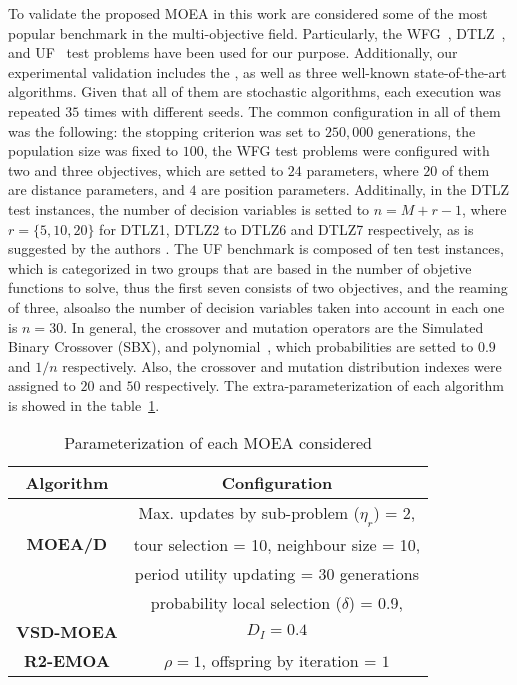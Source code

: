 %
To validate the proposed MOEA in this work are considered some of the most popular benchmark in the multi-objective field.
%
Particularly, the WFG~\cite{Joel:WFG}, DTLZ~\cite{Joel:DTLZ}, and UF~\cite{Joel:CEC2009} test problems have been used for our purpose. 
%
Additionally, our experimental validation includes the \VSDMOEA{}, as well as three well-known state-of-the-art algorithms.
%
Given that all of them are stochastic algorithms, each execution was repeated $35$ times with different seeds.
%
The common configuration in all of them was the following: the stopping criterion was set to $250,000$ generations, the population size was fixed to $100$, the WFG test problems were configured with two and three objectives, which are setted to $24$ parameters, where $20$ of them are distance parameters, and $4$ are position parameters.
%
Additinally, in the DTLZ test instances, the number of decision variables is setted to $n=M+r-1$, where $r=\{5, 10, 20\}$ for DTLZ1, DTLZ2 to DTLZ6 and DTLZ7 respectively, as is suggested by the authors \cite{Joel:DTLZ}.  
% 
The UF benchmark is composed of ten test instances, which is categorized in two groups that are based in the number of objetive functions to solve, thus the first seven consists of two objectives, and the reaming of three, alsoalso  the number of decision variables taken into account in each one is $n=30$.
%
In general, the crossover and mutation operators are the Simulated Binary Crossover (SBX), and polynomial~\cite{Joel:SBX1994, Joel:Mutation}, which probabilities are setted to $0.9$ and $1/n$ respectively.
%
Also, the crossover and mutation distribution indexes were assigned to $20$ and $50$ respectively.
%
The extra-parameterization of each algorithm is showed in the table~\ref{tab:Parametrization}.
%
\begin{table}[t]
\centering
\caption{Parameterization of each MOEA considered}
\label{tab:Parametrization}
\begin{tabular}{c|c}
\hline
\textbf{Algorithm} & \textbf{Configuration} \\ \hline
\multirow{3}{*}{\textbf{MOEA/D}} &Max. updates by sub-problem ($\eta_r$) = 2, \\
 & tour selection = 10,   neighbour size = 10, \\
 & period utility updating = 30 generations \\ 
 & probability local selection ($\delta$) = 0.9,\\ \hline
\textbf{VSD-MOEA} & $D_I=0.4$ \\ \hline
\textbf{R2-EMOA} & $\rho=1$, offspring by iteration = $1$ \\ \hline
\end{tabular}
\end{table}


